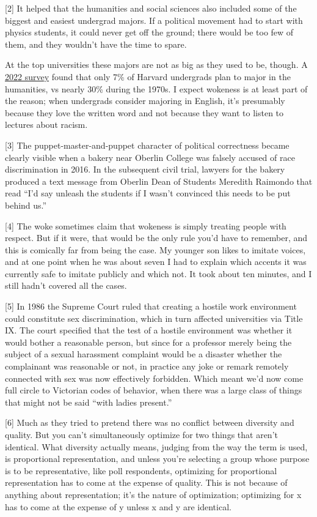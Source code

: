 {[}2{]} It helped that the humanities and social sciences also included
some of the biggest and easiest undergrad majors. If a political
movement had to start with physics students, it could never get off the
ground; there would be too few of them, and they wouldn't have the time
to spare.

At the top universities these majors are not as big as they used to be,
though. A
\href{https://www.newyorker.com/magazine/2023/03/06/the-end-of-the-english-major}{2022
survey} found that only 7\% of Harvard undergrads plan to major in the
humanities, vs nearly 30\% during the 1970s. I expect wokeness is at
least part of the reason; when undergrads consider majoring in English,
it's presumably because they love the written word and not because they
want to listen to lectures about racism.

{[}3{]} The puppet-master-and-puppet character of political correctness
became clearly visible when a bakery near Oberlin College was falsely
accused of race discrimination in 2016. In the subsequent civil trial,
lawyers for the bakery produced a text message from Oberlin Dean of
Students Meredith Raimondo that read ``I'd say unleash the students if I
wasn't convinced this needs to be put behind us.''

{[}4{]} The woke sometimes claim that wokeness is simply treating people
with respect. But if it were, that would be the only rule you'd have to
remember, and this is comically far from being the case. My younger son
likes to imitate voices, and at one point when he was about seven I had
to explain which accents it was currently safe to imitate publicly and
which not. It took about ten minutes, and I still hadn't covered all the
cases.

{[}5{]} In 1986 the Supreme Court ruled that creating a hostile work
environment could constitute sex discrimination, which in turn affected
universities via Title IX. The court specified that the test of a
hostile environment was whether it would bother a reasonable person, but
since for a professor merely being the subject of a sexual harassment
complaint would be a disaster whether the complainant was reasonable or
not, in practice any joke or remark remotely connected with sex was now
effectively forbidden. Which meant we'd now come full circle to
Victorian codes of behavior, when there was a large class of things that
might not be said ``with ladies present.''

{[}6{]} Much as they tried to pretend there was no conflict between
diversity and quality. But you can't simultaneously optimize for two
things that aren't identical. What diversity actually means, judging
from the way the term is used, is proportional representation, and
unless you're selecting a group whose purpose is to be representative,
like poll respondents, optimizing for proportional representation has to
come at the expense of quality. This is not because of anything about
representation; it's the nature of optimization; optimizing for x has to
come at the expense of y unless x and y are identical.

